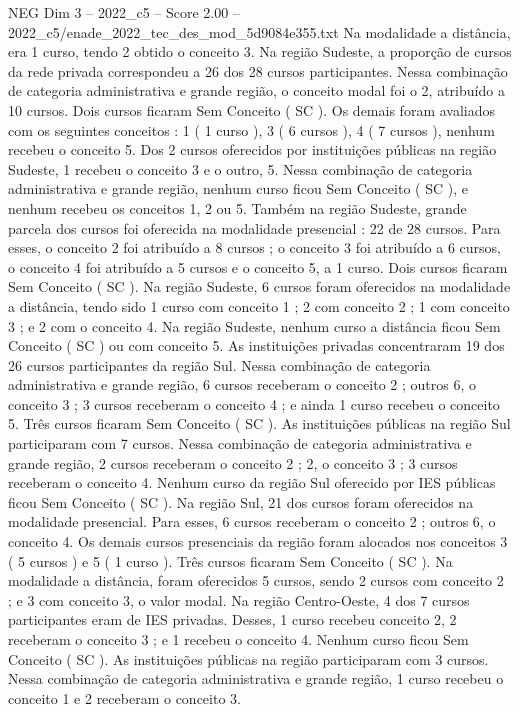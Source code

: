 \begin{textsample}{NEG Dim 3 – 2022\_c5 – Score 2.00 – 2022\_c5/enade\_2022\_tec\_des\_mod\_5d9084e355.txt}
Na modalidade a distância, era 1 curso, tendo 2 obtido o conceito 3.
Na região Sudeste, a proporção de cursos da rede privada correspondeu a 26 dos 28 cursos participantes.
Nessa combinação de categoria administrativa e grande região, o conceito modal foi o 2, atribuído a 10 cursos.
Dois cursos ficaram Sem Conceito ( SC ).
Os demais foram avaliados com os seguintes conceitos : 1 ( 1 curso ), 3 ( 6 cursos ), 4 ( 7 cursos ), nenhum recebeu o conceito 5.
Dos 2 cursos oferecidos por instituições públicas na região Sudeste, 1 recebeu o conceito 3 e o outro, 5.
Nessa combinação de categoria administrativa e grande região, nenhum curso ficou Sem Conceito ( SC ), e nenhum recebeu os conceitos 1, 2 ou 5.
Também na região Sudeste, grande parcela dos cursos foi oferecida na modalidade presencial : 22 de 28 cursos.
Para esses, o conceito 2 foi atribuído a 8 cursos ; o conceito 3 foi atribuído a 6 cursos, o conceito 4 foi atribuído a 5 cursos e o conceito 5, a 1 curso.
Dois cursos ficaram Sem Conceito ( SC ).
Na região Sudeste, 6 cursos foram oferecidos na modalidade a distância, tendo sido 1 curso com conceito 1 ; 2 com conceito 2 ; 1 com conceito 3 ; e 2 com o conceito 4.
Na região Sudeste, nenhum curso a distância ficou Sem Conceito ( SC ) ou com conceito 5.
As instituições privadas concentraram 19 dos 26 cursos participantes da região Sul.
Nessa combinação de categoria administrativa e grande região, 6 cursos receberam o conceito 2 ; outros 6, o conceito 3 ; 3 cursos receberam o conceito 4 ; e ainda 1 curso recebeu o conceito 5.
Três cursos ficaram Sem Conceito ( SC ).
As instituições públicas na região Sul participaram com 7 cursos.
Nessa combinação de categoria administrativa e grande região, 2 cursos receberam o conceito 2 ; 2, o conceito 3 ; 3 cursos receberam o conceito 4.
Nenhum curso da região Sul oferecido por IES públicas ficou Sem Conceito ( SC ).
Na região Sul, 21 dos cursos foram oferecidos na modalidade presencial.
Para esses, 6 cursos receberam o conceito 2 ; outros 6, o conceito 4.
Os demais cursos presenciais da região foram alocados nos conceitos 3 ( 5 cursos ) e 5 ( 1 curso ).
Três cursos ficaram Sem Conceito ( SC ).
Na modalidade a distância, foram oferecidos 5 cursos, sendo 2 cursos com conceito 2 ; e 3 com conceito 3, o valor modal.
Na região Centro-Oeste, 4 dos 7 cursos participantes eram de IES privadas.
Desses, 1 curso recebeu conceito 2, 2 receberam o conceito 3 ; e 1 recebeu o conceito 4.
Nenhum curso ficou Sem Conceito ( SC ).
As instituições públicas na região participaram com 3 cursos.
Nessa combinação de categoria administrativa e grande região, 1 curso recebeu o conceito 1 e 2 receberam o conceito 3.

\end{textsample}
